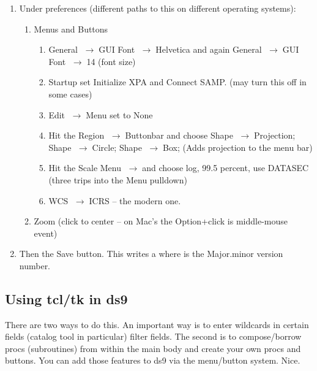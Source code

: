 \documentclass[letter,11pt,oneside]{article}
\newcommand{\menu}{\ensuremath{\;\rightarrow\;}}
\begin{document}
\vspace{-.15cm}
\begin{enumerate}\addtolength{\itemsep}{-0.5\baselineskip}
   \item   Under preferences (different paths to this on different operating
systems):
\vspace{-.15cm}
\begin{enumerate}\addtolength{\itemsep}{-0.5\baselineskip}
   \item   Menus and Buttons
\vspace{-.15cm}
\begin{enumerate}\addtolength{\itemsep}{-0.5\baselineskip}
   \item   General \menu GUI Font \menu Helvetica and again General \menu GUI Font \menu 14
(font size) 
   \item   Startup set Initialize XPA and Connect SAMP. (may turn this off in some cases)
   \item   Edit \menu Menu set to None
   \item   Hit the Region \menu Buttonbar and choose Shape \menu Projection; 
Shape \menu Circle; Shape \menu Box; (Adds projection to the menu bar)
   \item   Hit the Scale Menu \menu and choose log, 99.5 percent, use DATASEC
(three trips into the Menu pulldown)
   \item   WCS \menu ICRS -- the modern one.
\end{enumerate}

   \item   Zoom (click to center -- on Mac's the Option+click is middle-mouse event)
\end{enumerate}

   \item   Then the Save button. This writes a {\color{verbcolor}{\verb#~/.ds9/ds9.M.m.prf#}}
where {\color{verbcolor}{\verb#M.m#}} is the Major.minor version number.
\end{enumerate}

\subsection{Using tcl/tk in ds9}

There are two ways to do this. An important way is to enter wildcards
in certain fields (catalog tool in particular) filter fields. The
second is to compose/borrow procs (subroutines) from within the
main body and create your own procs and buttons. You can add those
features to ds9 via the menu/button system. Nice.
\end{document}
